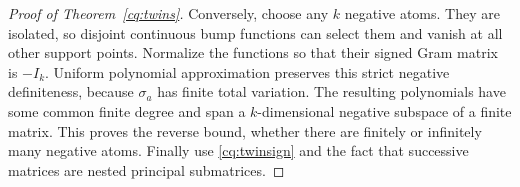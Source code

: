 \begin{proof}[Proof of Theorem~\ref{cq:twins}]
Conversely, choose any \(k\) negative atoms. They are isolated, so disjoint
continuous bump functions can select them and vanish at all other support
points. Normalize the functions so that their signed Gram matrix is
\(-I_k\). Uniform polynomial approximation preserves this strict negative
definiteness, because \(\sigma_a\) has finite total variation. The resulting
polynomials have some common finite degree and span a \(k\)-dimensional
negative subspace of a finite matrix. This proves the reverse bound,
whether there are finitely or infinitely many negative atoms.
Finally use \eqref{cq:twinsign} and the fact that successive matrices are
nested principal submatrices.
\end{proof}
